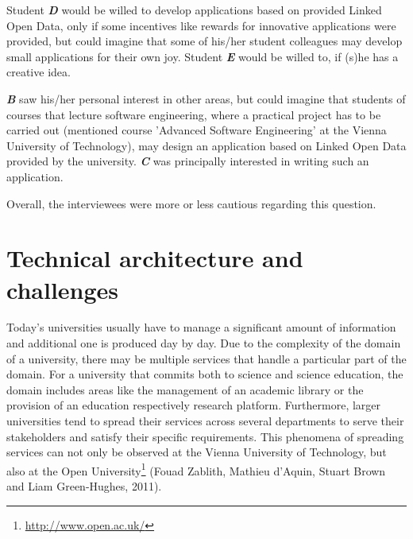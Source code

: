 \documentclass{article}
\begin{document}
Student \textit{\textbf{D}} would be willed to develop applications based on provided Linked Open Data, only if some incentives like rewards for innovative applications were provided, but could imagine that some of his/her student colleagues may develop small applications for their own joy. Student \textit{\textbf{E}} would be willed to, if (s)he has a creative idea. 

\textit{\textbf{B}} saw his/her personal interest in other areas, but could imagine that students of courses that lecture software engineering, where a practical project has to be carried out (mentioned course 'Advanced Software Engineering' at the Vienna University of Technology), may design an application based on Linked Open Data provided by the university. \textit{\textbf{C}} was principally interested in writing such an application.

Overall, the interviewees were more or less cautious regarding this question.




\section{Technical architecture and challenges}
\label{technical-architecture-challenges}

Today's universities usually have to manage a significant amount of information and additional one is produced day by day. Due to the complexity of the domain of a university, there may be multiple services that handle a particular part of the domain. For a university that commits both to science and science education, the domain includes areas like the management of an academic library or the provision of an education respectively research platform. Furthermore, larger universities tend to spread their services across several departments to serve their stakeholders and satisfy their specific requirements. This phenomena of spreading services can not only be observed at the Vienna University of Technology, but also at the Open University\footnote{\url{http://www.open.ac.uk/}} (Fouad Zablith, Mathieu d’Aquin, Stuart Brown and Liam Green-Hughes, 2011)\cite{zablith_consuming_2011}.
\end{document}
